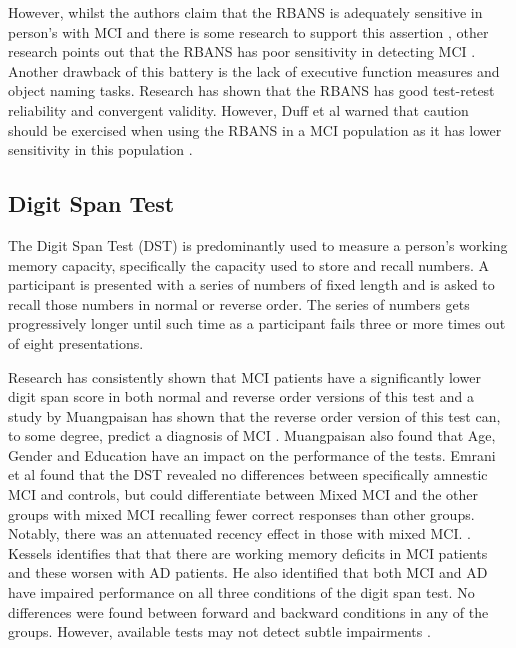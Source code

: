 \documentclass[10pt, letterpaper, twoside, openany]{thesis}
\begin{document}
However, whilst the authors claim that the RBANS is adequately sensitive in person's with MCI \cite{Randolph1998} and there is some research to support this assertion \cite{Karantzoulis2013}, other research points out that the RBANS has poor sensitivity in detecting MCI \cite{Duff2010}. Another drawback of this battery is the lack of executive function measures and object naming tasks. Research has shown that the RBANS has good test-retest reliability and convergent validity. However, Duff et al warned that caution should be exercised when using the RBANS in a MCI population as it has lower sensitivity in this population \cite{Duff2010}.

\subsection{Digit Span Test}
The Digit Span Test (DST) is predominantly used to measure a person's working memory capacity, specifically the capacity used to store and recall numbers. A participant is presented with a series of numbers of fixed length and is asked to recall those numbers in normal or reverse order. The series of numbers gets progressively longer until such time as a participant fails three or more times out of eight presentations.
\par
Research has consistently shown that MCI patients have a significantly lower digit span score in both normal and reverse order versions of this test and a study by Muangpaisan has shown that the reverse order version of this test can, to some degree, predict a diagnosis of MCI \cite{Muangpaisan2008}. Muangpaisan also found that Age, Gender and Education have an impact on the performance of the tests. Emrani et al found that the DST revealed no differences between specifically amnestic MCI and controls, but could differentiate between Mixed MCI and the other groups with mixed MCI recalling fewer correct responses than other groups. Notably, there was an attenuated recency effect in those with mixed MCI. \cite{Emrani2018}. Kessels identifies that that there are working memory deficits in MCI patients and these worsen with AD patients. \cite{Kessels2011} He also identified that both MCI and AD have impaired performance on all three conditions of the digit span test. No differences were found between forward and backward conditions in any of the groups. However, available tests may not detect subtle impairments \cite{Kessels2015}.
\end{document}
